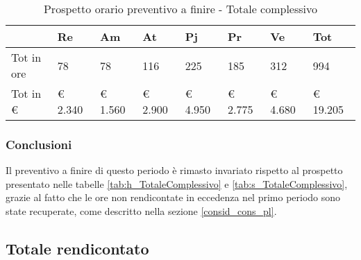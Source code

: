 					\begin{table}[H] \begin{center} \begin{tabular}{llllllll}
					\toprule
						&	\textbf{Re}	&	\textbf{Am}	&	\textbf{At}	&	\textbf{Pj}	&	\textbf{Pr}	&	\textbf{Ve}	&	\textbf{Tot}	 \\
						\midrule
						Tot in ore	&	78	&	78	&	116	&	225	&	185	&	312	&	994	 \\
				
				
						Tot in €	&	 €        2.340 	 & 	 €    1.560 	 & 	 €        2.900 	 & 	 €    4.950 	 & 	 €        2.775 	 & 	 €    4.680 	 & 	 €           19.205 	 \\
						\bottomrule
					\end{tabular} \end{center} \caption{Prospetto orario preventivo a finire -
					Totale complessivo} \end{table}


		\subsubsection{Conclusioni} Il preventivo a finire di questo periodo è rimasto invariato rispetto al prospetto presentato nelle tabelle \ref{tab:h_TotaleComplessivo} e \ref{tab:s_TotaleComplessivo}, grazie al fatto che le ore non rendicontate in eccedenza nel primo periodo sono state recuperate, come descritto nella sezione \ref{consid_cons_pl}. 
	\newpage
	\subsection{Totale rendicontato}
